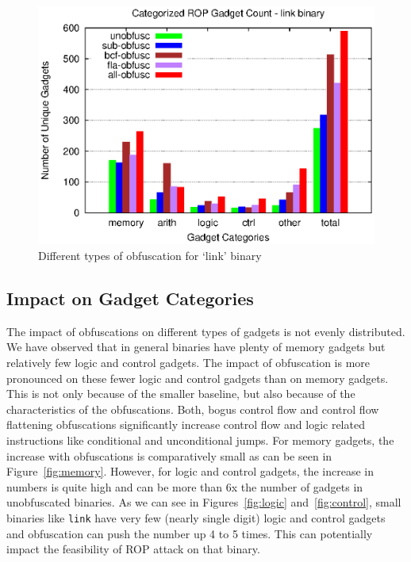 \begin{figure}[h]
    \includegraphics[width=\linewidth]{figures/link-all.eps}
    \captionsetup{font=footnotesize, labelfont=bf, justification=centering}
    \caption{Different types of obfuscation for `link' binary}
    \label{fig:link_all}
\end{figure}


\subsection{Impact on Gadget Categories}
The impact of obfuscations on different types of gadgets is not evenly 
distributed. We have observed that in general binaries have plenty of 
memory gadgets but relatively few logic and control gadgets. The impact of 
obfuscation is more pronounced on these fewer logic and control gadgets 
than on memory gadgets. This is not only because of the smaller baseline, 
but also because of the characteristics of the obfuscations. Both, bogus 
control flow and control flow flattening obfuscations significantly 
increase control flow and logic related instructions like conditional and 
unconditional jumps. For memory gadgets, the increase with obfuscations is 
comparatively small as can be seen in Figure~\ref{fig:memory}. However, 
for logic and control gadgets, the increase in numbers is quite high and 
can be more than 6x the number of gadgets in unobfuscated binaries. As we 
can see in Figures~\ref{fig:logic} and~\ref{fig:control}, small binaries 
like \texttt{link} have very few (nearly single digit) logic and control 
gadgets and obfuscation can push the number up 4 to 5 times. This can 
potentially impact the feasibility of ROP attack on that binary. 

